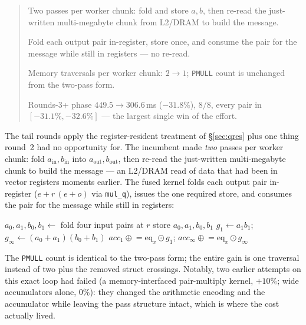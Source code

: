 \documentclass[11pt]{article}
\newcommand{\eq}{\mathrm{eq}}
\newcommand{\code}[1]{\texttt{#1}}
\newenvironment{optsummary}{%
  \begin{quote}\small
  \begin{description}
  \setlength{\itemsep}{1pt}\setlength{\parsep}{0pt}\setlength{\topsep}{2pt}
}{%
  \end{description}
  \end{quote}
}
\begin{document}
\begin{optsummary}
\item[Baseline:] Two passes per worker chunk: fold and store $a,b$, then re-read the just-written multi-megabyte chunk from L2/DRAM to build the message.
\item[Improvement:] Fold each output pair in-register, store once, and consume the pair for the message while still in registers --- no re-read.
\item[Mechanism:] Memory traversals per worker chunk: $2\to1$; \code{PMULL} count is unchanged from the two-pass form.
\item[Result:] Rounds-3+ phase $449.5\to306.6\,$ms ($-31.8\%$), $8/8$, every pair in $[-31.1\%,-32.6\%]$ --- the largest single win of the effort.
\end{optsummary}

The tail rounds apply the register-resident treatment of \S\ref{sec:qres}
plus one thing round~2 had no opportunity for. The incumbent made \emph{two} passes per worker chunk:
fold $a_{\mathrm{in}},b_{\mathrm{in}}$ into $a_{\mathrm{out}},b_{\mathrm{out}}$,
then re-read the just-written multi-megabyte chunk to build the message ---
an L2/DRAM read of data that had been in vector registers moments earlier.
The fused kernel folds each output pair in-register
($e + r\,(e+o)$ via \code{mul\_q}), issues the one required store, and
consumes the pair for the message while still in registers:

\begin{algorithmic}[1]
  \State $a_0,a_1,b_0,b_1 \gets$ fold four input pairs at $r$
  \State store $a_0,a_1,b_0,b_1$ 
  \State $g_1 \gets a_1 b_1$;\quad
         $g_\infty \gets (a_0{+}a_1)(b_0{+}b_1)$
         \Comment{\code{mul\_q}, never leaving registers}
  \State $\mathit{acc}_1 \mathrel{\oplus}= \eq_x \odot g_1$;\quad
         $\mathit{acc}_\infty \mathrel{\oplus}= \eq_x \odot g_\infty$
\EndFor
\end{algorithmic}

\noindent
The \code{PMULL} count is identical to the two-pass form; the entire gain is
one traversal instead of two plus the removed struct crossings. Notably, two
earlier attempts on this exact loop had failed (a memory-interfaced pair-multiply
kernel, $+10\%$; wide accumulators alone, $0\%$): they changed the arithmetic
encoding and the accumulator while leaving the pass structure intact, which is
where the cost actually lived.
\end{document}
